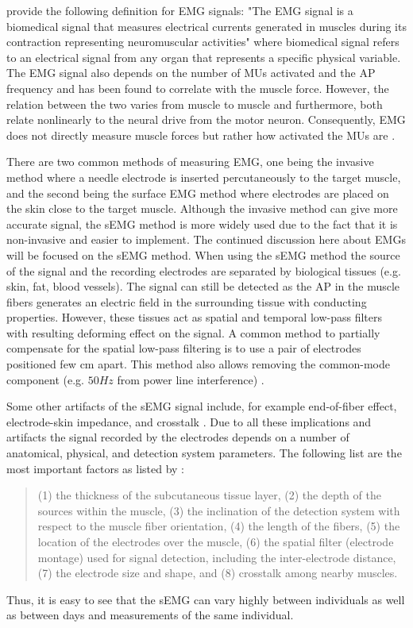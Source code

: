 \textcite{Raez2006} provide the following definition for EMG signals: "The EMG signal is a biomedical signal that measures electrical currents generated in muscles during its contraction representing neuromuscular activities" \parencite[1]{Raez2006} where biomedical signal refers to an electrical signal from any organ that represents a specific physical variable.
The \ac{EMG} signal also depends on the number of \acp{MU} activated and the \ac{AP} frequency and has been found to correlate with the muscle force.
However, the relation between the two varies from muscle to muscle and furthermore, both relate nonlinearly to the neural drive from the motor neuron.
Consequently, \ac{EMG} does not directly measure muscle forces but rather how activated the \acp{MU} are \cite{Enoka2016, Farina2016}.

There are two common methods of measuring \ac{EMG}, one being the invasive method where a needle electrode is inserted percutaneously to the target muscle, and the second being the surface \ac{EMG} method where electrodes are placed on the skin close to the target muscle. 
Although the invasive method can give more accurate signal, the \ac{sEMG} method is more widely used due to the fact that it is non-invasive and easier to implement. 
The continued discussion here about \ac{EMG}s will be focused on the \ac{sEMG} method.
When using the \ac{sEMG} method the source of the signal and the recording electrodes are separated by biological tissues (e.g. skin, fat, blood vessels).
The signal can still be detected as the \ac{AP} in the muscle fibers generates an electric field in the surrounding tissue with conducting properties.
However, these tissues act as spatial and temporal low-pass filters with resulting deforming effect on the signal.
A common method to partially compensate for the spatial low-pass filtering is to use a pair of electrodes positioned few cm apart.
This method also allows removing the common-mode component (e.g. $50Hz$ from power line interference) \cite{Farina2016}.

Some other artifacts of the \ac{sEMG} signal include, for example end-of-fiber effect, electrode-skin impedance, and crosstalk \cite{Farina2016}.
Due to all these implications and artifacts the signal recorded by the electrodes depends on a number of anatomical, physical, and detection system parameters. The following list are the most important factors as listed by \textcite[p. 41]{Farina2016}:
\begin{quote}
(1) the thickness of the subcutaneous tissue layer,
(2) the depth of the sources within the muscle,
(3) the inclination of the detection system with respect to the muscle fiber orientation,
(4) the length of the fibers,
(5) the location of the electrodes over the muscle,
(6) the spatial filter (electrode montage) used for signal detection, including the inter-electrode distance,
(7) the electrode size and shape, and
(8) crosstalk among nearby muscles.
\end{quote}
Thus, it is easy to see that the \ac{sEMG} can vary highly between individuals as well as between days and measurements of the same individual.

